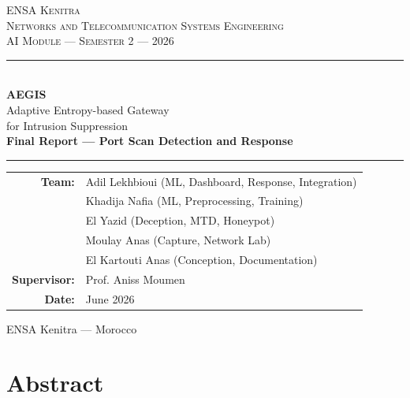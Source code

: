 \documentclass[12pt,a4paper]{report}
\begin{document}
\begin{titlepage}
\centering
\vspace*{1cm}

{\Large\textsc{ENSA Kenitra}}\\[0.2cm]
{\small\textsc{Networks and Telecommunication Systems Engineering}}\\[0.2cm]
{\small\textsc{AI Module --- Semester 2 --- 2026}}

\vspace{2cm}

\rule{\textwidth}{0.5pt}\\[0.8cm]

{\Huge\bfseries AEGIS}\\[0.4cm]
{\Large Adaptive Entropy-based Gateway\\for Intrusion Suppression}\\[0.3cm]
{\large\bfseries Final Report --- Port Scan Detection and Response}

\vspace{0.8cm}
\rule{\textwidth}{0.5pt}

\vspace{2cm}

\begin{minipage}{0.85\textwidth}
\centering
\begin{tabular}{rl}
\textbf{Team:} & Adil Lekhbioui (ML, Dashboard, Response, Integration)\\
 & Khadija Nafia (ML, Preprocessing, Training)\\
 & El Yazid (Deception, MTD, Honeypot)\\
 & Moulay Anas (Capture, Network Lab)\\
 & El Kartouti Anas (Conception, Documentation)\\[0.5cm]
\textbf{Supervisor:} & Prof. Aniss Moumen\\[0.5cm]
\textbf{Date:} & June 2026\\
\end{tabular}
\end{minipage}

\vfill

{\small ENSA Kenitra --- Morocco}
\end{titlepage}

\newpage
\section*{Abstract}
\end{document}

